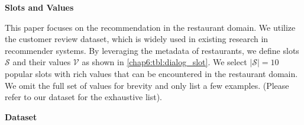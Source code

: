 \textbf{Slots and Values}
\label{chap6:sec:slotvalue}

This paper focuses on the recommendation in the restaurant domain.
We utilize the customer review dataset, which is widely used in existing research in recommender systems.
By leveraging the metadata of restaurants, we define slots $\mathcal{S}$ and their values $\mathcal{V}$ as shown in \ref{chap6:tbl:dialog_slot}. 
We select $\vert \mathcal{S} \vert = 10$ popular slots with rich values that can be encountered in the restaurant domain.
We omit the full set of values for brevity and only list a few examples. (Please refer to our dataset for the exhaustive list).

\begin{table}[t]
    \centering
    \vspace{-4pt}
    \caption{Slots $\mathcal{S}$ and values $\mathcal{V}$.}     
    \vspace{-10pt}
\label{chap6:tbl:dialog_slot}
\end{table}


\textbf{Dataset}
\label{chap6:sec:dataset}


